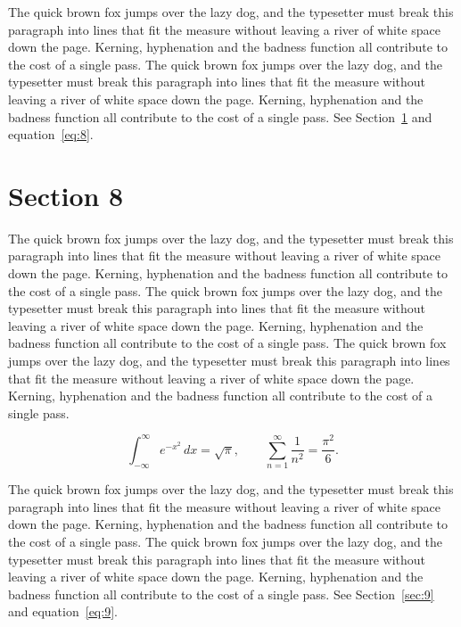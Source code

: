 \documentclass{article}
\begin{document}
The quick brown fox jumps over the lazy dog, and the typesetter must break this paragraph into lines that fit the measure without leaving a river of white space down the page. Kerning, hyphenation and the badness function all contribute to the cost of a single pass. The quick brown fox jumps over the lazy dog, and the typesetter must break this paragraph into lines that fit the measure without leaving a river of white space down the page. Kerning, hyphenation and the badness function all contribute to the cost of a single pass. 
See Section~\ref{sec:8} and equation~\eqref{eq:8}.
\section{Section 8}
\label{sec:8}
The quick brown fox jumps over the lazy dog, and the typesetter must break this paragraph into lines that fit the measure without leaving a river of white space down the page. Kerning, hyphenation and the badness function all contribute to the cost of a single pass. The quick brown fox jumps over the lazy dog, and the typesetter must break this paragraph into lines that fit the measure without leaving a river of white space down the page. Kerning, hyphenation and the badness function all contribute to the cost of a single pass. The quick brown fox jumps over the lazy dog, and the typesetter must break this paragraph into lines that fit the measure without leaving a river of white space down the page. Kerning, hyphenation and the badness function all contribute to the cost of a single pass. 

\begin{equation}\label{eq:8}
\int_{-\infty}^{\infty} e^{-x^{2}}\,dx = \sqrt{\pi}, \qquad
\sum_{n=1}^{\infty} \frac{1}{n^{2}} = \frac{\pi^{2}}{6}.
\end{equation}

The quick brown fox jumps over the lazy dog, and the typesetter must break this paragraph into lines that fit the measure without leaving a river of white space down the page. Kerning, hyphenation and the badness function all contribute to the cost of a single pass. The quick brown fox jumps over the lazy dog, and the typesetter must break this paragraph into lines that fit the measure without leaving a river of white space down the page. Kerning, hyphenation and the badness function all contribute to the cost of a single pass. 
See Section~\ref{sec:9} and equation~\eqref{eq:9}.
\end{document}

